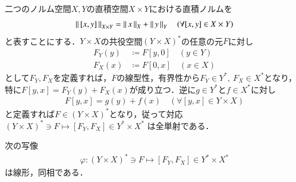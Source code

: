 	二つのノルム空間$X,Y$の直積空間$X \times Y$における直積ノルムを
	\begin{align}
		\left\|\, [x,y]\, \right\|_{X \times Y} = \left\|\, x\, \right\|_{X} + \left\|\, y\, \right\|_{Y} \quad (\forall [x,y] \in X \times Y)
	\end{align}
	と表すことにする．$Y \times X$の共役空間$(Y \times X)^*$の任意の元$F$に対し
	\begin{align}
		F_Y(y) &\coloneqq F[y,0] \quad (y \in Y) \\
		F_X(x) &\coloneqq F[0,x] \quad (x \in X) \label{eq:thm_T_star_closed_1}
	\end{align}
	として$F_Y, F_X$を定義すれば，$F$の線型性，有界性から$F_Y \in Y^*,\ F_X \in X^*$となり，
	特に$F[y,x] = F_Y(y) + F_X(x)$が成り立つ．逆に$g \in Y^*$と$f \in X^*$に対し
	\begin{align}
		F[y,x] = g(y) + f(x) \quad (\forall [y,x] \in Y \times X)
	\end{align}
	と定義すれば$F \in (Y \times X)^*$となり，従って対応$(Y \times X)^* \ni F \longmapsto [F_Y,F_X] \in Y^* \times X^*$
	は全単射である．
	\begin{itembox}[l]{}
		\begin{lem}
			次の写像
			\begin{align}
				\varphi : (Y \times X)^* \ni F \longmapsto [F_Y,F_X] \in Y^* \times X^*
			\end{align}
			は線形，同相である．\label{lem:T_star_closed_2}
		\end{lem}
	\end{itembox}
	
